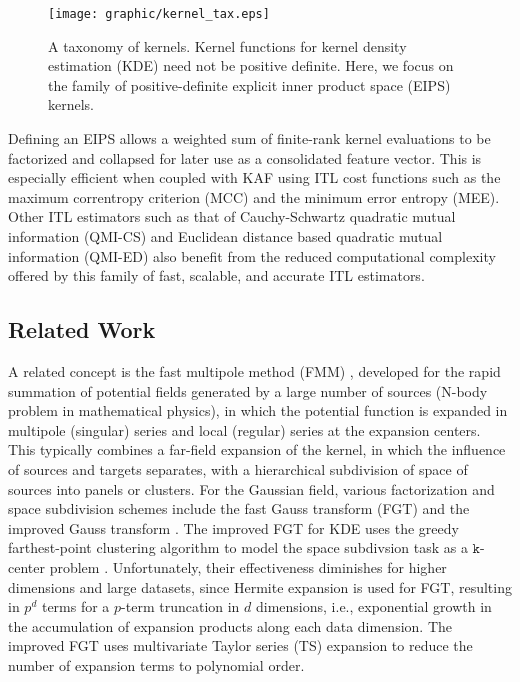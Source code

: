 \documentclass[8pt,twocolumn]{IEEEtran}
\begin{document}
\begin{figure}[t!]
	\centering
	\texttt{[image: graphic/kernel\_tax.eps]}
	\caption{A taxonomy of kernels. Kernel functions for kernel density estimation (KDE) need not be positive definite. Here, we focus on the family of positive-definite explicit inner product space (EIPS) kernels.}
	\label{fig:tax}
\end{figure}
Defining an EIPS allows a weighted sum of finite-rank kernel evaluations to be factorized and collapsed for later use as a consolidated feature vector. This is especially efficient when coupled with KAF using ITL cost functions such as the maximum correntropy criterion (MCC) and the minimum error entropy (MEE). Other ITL estimators such as that of Cauchy-Schwartz quadratic mutual information (QMI-CS) and Euclidean distance based quadratic mutual information (QMI-ED) also benefit from the reduced computational complexity offered by this family of fast, scalable, and accurate ITL estimators.

\subsection{Related Work}

A related concept is the fast multipole method (FMM) \cite{GREENGARD1987FMM}, developed for the rapid summation of potential fields generated by a large number of sources (N-body problem in mathematical physics), in which the potential function is expanded in multipole (singular) series and local (regular) series at the expansion centers. This typically combines a far-field expansion of the kernel, in which the influence of sources and targets separates, with a hierarchical subdivision of space of sources into panels or clusters. For the Gaussian field, various factorization and space subdivision schemes include the fast Gauss transform (FGT) and the improved Gauss transform \cite{Greengard1991}. The improved FGT for KDE uses the greedy farthest-point clustering algorithm to model the space subdivsion task as a $\mathtt{k}$-center problem \cite{Yang2003}. Unfortunately, their effectiveness diminishes for higher dimensions and large datasets, since Hermite expansion is used for FGT, resulting in $p^d$ terms for a $p$-term truncation in $d$ dimensions, i.e., exponential growth in the accumulation of expansion products along each data dimension. The improved FGT uses multivariate Taylor series (TS) expansion to reduce the number of expansion terms to polynomial order. 
\end{document}
